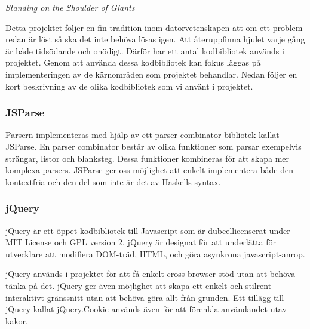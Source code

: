 \emph{Standing on the Shoulder of Giants}

Detta projektet följer en fin tradition inom datorvetenskapen att om ett problem redan är löst så ska det inte behöva lösas igen. Att återuppfinna hjulet varje gång är både tidsödande och onödigt. 
Därför har ett antal kodbibliotek används i projektet. 
Genom att använda dessa kodbibliotek kan fokus läggas på implementeringen av de kärnområden som projektet behandlar.
Nedan följer en kort beskrivning av de olika kodbibliotek som vi använt i projektet.

\subsubsection{JSParse}  
Parsern implementeras med hjälp av ett parser combinator bibliotek kallat JSParse. 
En parser combinator består av olika funktioner som parsar exempelvis strängar, listor och blanksteg. Dessa funktioner kombineras för att skapa mer komplexa parsers. JSParse ger oss möjlighet att enkelt implementera både den kontextfria och den del som inte är det av Haskells syntax.

\subsubsection{jQuery} 

jQuery är ett öppet kodbibliotek till Javascript som är dubeellicenserat under MIT License och GPL version 2.  
jQuery är designat för att underlätta för utvecklare att modifiera DOM-träd, HTML, och göra asynkrona javascript-anrop.

jQuery används i projektet för att få enkelt cross browser stöd utan att behöva tänka på det. 
jQuery ger även möjlighet att skapa ett enkelt och stilrent interaktivt gränssnitt utan att behöva göra allt från grunden.
Ett tillägg till jQuery kallat jQuery.Cookie används även för att förenkla användandet utav kakor.
